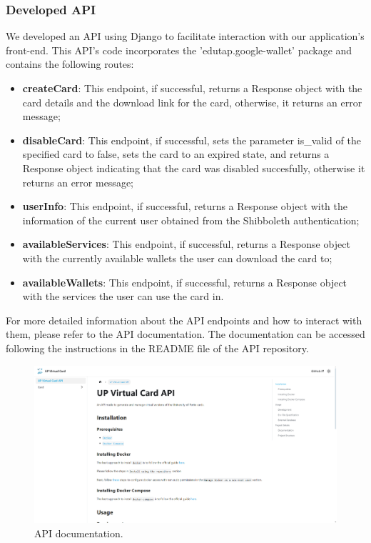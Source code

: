 \documentclass[12pt]{article}
\begin{document}
\subsubsection{Developed API}

We developed an API using Django to facilitate interaction with our application's front-end.
This API's code incorporates the 'edutap.google-wallet' package and contains the following routes:

\begin{itemize}
	\item \textbf{createCard}: This endpoint, if successful, returns a Response object with the card details
	      and the download link for the card, otherwise, it returns an error message;
	\item \textbf{disableCard}: This endpoint, if successful, sets the parameter is\_valid of the specified card to false,
	      sets the card to an expired state, and returns a Response object indicating that the card was disabled succesfully, otherwise it returns an error message;
	\item \textbf{userInfo}: This endpoint, if successful, returns a Response object with the information of
	      the current user obtained from the Shibboleth authentication;
	\item \textbf{availableServices}: This endpoint, if successful, returns a Response object with the currently available wallets the user can download the card to;
	\item \textbf{availableWallets}: This endpoint, if successful, returns a Response object with the services the user can use the card in.
\end{itemize}

For more detailed information about the API endpoints and how to interact with them, please refer to the API documentation.
The documentation can be accessed following the instructions in the README file of the API repository.

\begin{figure}[H]
	\centering
	\includegraphics[width=\textwidth]{api_documentation.png}
	\caption{API documentation.}
\end{figure}
\end{document}
